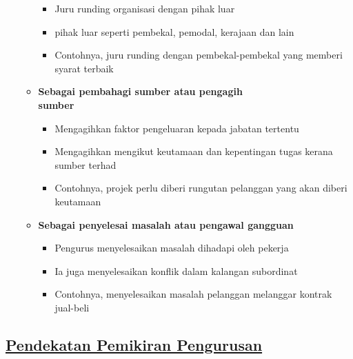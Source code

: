 \documentclass{book}
\begin{document}
\begin{multicols*}{2}
\begin{enumerate}
\begin{itemize}[leftmargin=*]
\begin{itemize}[leftmargin=*]
            \item Juru runding organisasi dengan pihak luar
            \item pihak luar seperti pembekal, pemodal, kerajaan dan lain
            \item Contohnya, juru runding dengan pembekal-pembekal yang memberi syarat terbaik
          \end{itemize}
        \item \textbf{Sebagai pembahagi sumber atau pengagih\\ sumber}
          \begin{itemize}[leftmargin=*]
            \item Mengagihkan faktor pengeluaran kepada jabatan tertentu
            \item Mengagihkan mengikut keutamaan dan kepentingan tugas kerana sumber terhad
            \item Contohnya, projek perlu diberi rungutan pelanggan yang akan diberi keutamaan
          \end{itemize}
        \item \textbf{Sebagai penyelesai masalah atau pengawal gangguan}
          \begin{itemize}[leftmargin=*]
            \item Pengurus menyelesaikan masalah dihadapi oleh pekerja
            \item Ia juga menyelesaikan konflik dalam kalangan subordinat
            \item Contohnya, menyelesaikan masalah pelanggan melanggar kontrak jual-beli 
          \end{itemize}
      \end{itemize} 
    \end{enumerate}
    
    \subsection*{\underline{Pendekatan Pemikiran Pengurusan}}

\end{multicols*}
\end{document}
